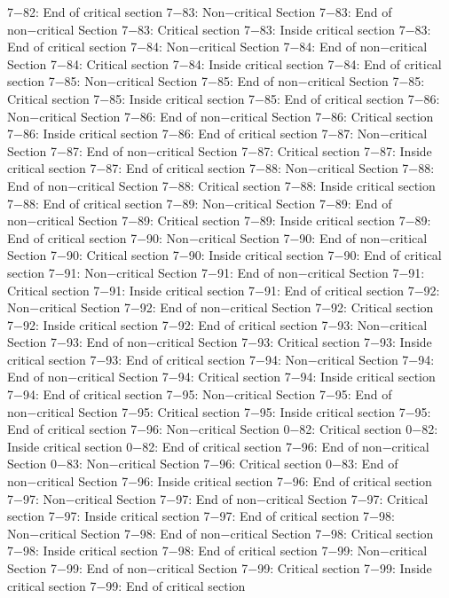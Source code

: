 7−82: End of critical section
7−83: Non−critical Section
7−83: End of non−critical Section
7−83: Critical section
7−83: Inside critical section
7−83: End of critical section
7−84: Non−critical Section
7−84: End of non−critical Section
7−84: Critical section
7−84: Inside critical section
7−84: End of critical section
7−85: Non−critical Section
7−85: End of non−critical Section
7−85: Critical section
7−85: Inside critical section
7−85: End of critical section
7−86: Non−critical Section
7−86: End of non−critical Section
7−86: Critical section
7−86: Inside critical section
7−86: End of critical section
7−87: Non−critical Section
7−87: End of non−critical Section
7−87: Critical section
7−87: Inside critical section
7−87: End of critical section
7−88: Non−critical Section
7−88: End of non−critical Section
7−88: Critical section
7−88: Inside critical section
7−88: End of critical section
7−89: Non−critical Section
7−89: End of non−critical Section
7−89: Critical section
7−89: Inside critical section
7−89: End of critical section
7−90: Non−critical Section
7−90: End of non−critical Section
7−90: Critical section
7−90: Inside critical section
7−90: End of critical section
7−91: Non−critical Section
7−91: End of non−critical Section
7−91: Critical section
7−91: Inside critical section
7−91: End of critical section
7−92: Non−critical Section
7−92: End of non−critical Section
7−92: Critical section
7−92: Inside critical section
7−92: End of critical section
7−93: Non−critical Section
7−93: End of non−critical Section
7−93: Critical section
7−93: Inside critical section
7−93: End of critical section
7−94: Non−critical Section
7−94: End of non−critical Section
7−94: Critical section
7−94: Inside critical section
7−94: End of critical section
7−95: Non−critical Section
7−95: End of non−critical Section
7−95: Critical section
7−95: Inside critical section
7−95: End of critical section
7−96: Non−critical Section
0−82: Critical section
0−82: Inside critical section
0−82: End of critical section
7−96: End of non−critical Section
0−83: Non−critical Section
7−96: Critical section
0−83: End of non−critical Section
7−96: Inside critical section
7−96: End of critical section
7−97: Non−critical Section
7−97: End of non−critical Section
7−97: Critical section
7−97: Inside critical section
7−97: End of critical section
7−98: Non−critical Section
7−98: End of non−critical Section
7−98: Critical section
7−98: Inside critical section
7−98: End of critical section
7−99: Non−critical Section
7−99: End of non−critical Section
7−99: Critical section
7−99: Inside critical section
7−99: End of critical section

